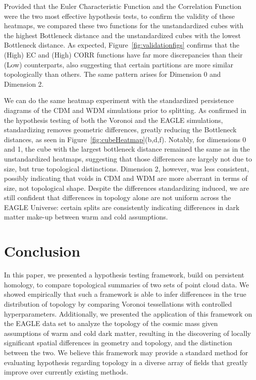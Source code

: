 \documentclass[12pt]{article}
\newcommand{\figref}[1]{Figure~\ref{#1}}
\begin{document}
Provided that the Euler Characteristic Function and the Correlation Function were the two most effective hypothesis tests, to confirm the validity of these heatmaps, we compared these two functions for the unstandardized cubes with the highest Bottleneck distance and the unstandardized cubes with the lowest Bottleneck distance. As expected, \figref{fig:validationfigs} confirms that the (High) EC and (High) CORR functions have far more discrepancies than their (Low) counterparts, also suggesting that certain partitions are more similar topologically than others. The same pattern arises for Dimension 0 and Dimension 2.  

We can do the same heatmap experiment with the standardized persistence diagrams of the CDM and WDM simulations prior to splitting. As confirmed in the hypothesis testing of both the Voronoi and the EAGLE simulations, standardizing removes geometric differences, greatly reducing the Bottleneck distances, as seen in \figref{fig:cubeHeatmap}(b,d,f). Notably, for dimensions 0 and 1, the cube with the largest bottleneck distance remained the same as in the unstandardized heatmaps, suggesting that those differences are largely not due to size, but true topological distinctions. Dimension 2, however, was less consistent, possibly indicating that voids in CDM and WDM are more aberrant in terms of size, not topological shape. Despite the differences standardizing induced, we are still confident that differences in topology alone are not uniform across the EAGLE Universe: certain splits are consistently indicating differences in dark matter make-up between warm and cold assumptions.


\section{Conclusion}
\label{sec:conc}
In this paper, we presented a hypothesis testing framework, build on persistent homology, to compare topological summaries of two sets of point cloud data. We showed empirically that such a framework is able to infer differences in the true distribution of topology by comparing Voronoi tessellations with controlled hyperparameters. Additionally, we presented the application of this framework on the EAGLE data set to analyze the topology of the cosmic mass given assumptions of warm and cold dark matter, resulting in the discovering of locally significant spatial differences in geometry and topology, and the distinction between the two. We believe this framework may provide a standard method for evaluating hypothesis regarding topology in a diverse array of fields that greatly improve over currently existing methods. 
\end{document}
